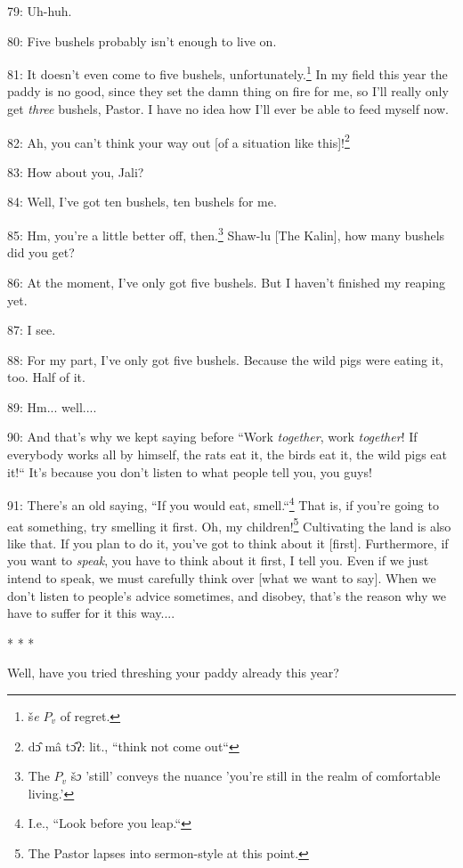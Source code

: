 79: Uh-huh.

80: Five bushels probably isn't enough to live on.

81: It doesn't even come to five bushels, unfortunately.\footnote{š\emph{e} $P_v$ of regret.} In my field this year
the paddy is no good, since they set the damn thing on fire for me, so I'll really
only get \textit{three} bushels, Pastor. I have no idea how I'll ever be able to
feed myself now.

82: Ah, you can't think your way out [of a situation like this]!\footnote{dɔ̂ mâ tɔ̂ʔ: lit., ``think not come out``}

83: How about you, Jali?

84: Well, I've got ten bushels, ten bushels for me.

85: Hm, you're a little better off, then.\footnote{The $P_v$ š\emph{ɔ} 'still' conveys the nuance 'you're still in the realm of comfortable living.'} Shaw-lu [The Kalin], how many bushels
did you get?

86: At the moment, I've only got five bushels. But I haven't finished my reaping
yet.

87: I see.

88: For my part, I've only got five bushels. Because the wild pigs were eating
it, too. Half of it.

89: Hm... well....

90: And that's why we kept saying before ``Work\textit{ together}, work
\textit{together}! If everybody works all by himself, the rats eat it, the birds
eat it, the wild pigs eat it!`` It's because you don't listen to what people
tell you, you guys!

91: There's an old saying, ``If you would eat, smell.``\footnote{I.e., ``Look before you leap.``} That
is, if you're going to eat something, try smelling it first. Oh, my children!\footnote{The Pastor lapses into sermon-style at this point.}
Cultivating the land is also like that. If you plan to do it, you've got to think
about it [first]. Furthermore, if you want to \textit{speak}, you have to think
about it first, I tell you. Even if we just intend to speak, we must carefully
think over [what we want to say]. When we don't listen to people's advice sometimes,
and disobey, that's the reason why we have to suffer for it this way....

\begin{center}
* * *
\end{center}

\leftskip=0pt
Well, have you tried threshing your paddy already this year?

